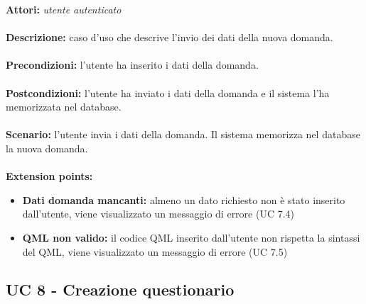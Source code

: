 \documentclass[a4paper,11pt]{article}
\begin{document}
\textbf{Attori:} \textit{utente autenticato}
\\ \\
\textbf{Descrizione:} caso d'uso che descrive l'invio dei dati della nuova domanda.\\
\\
\textbf{Precondizioni:} l'utente ha inserito i dati della domanda.\\
\\
\textbf{Postcondizioni:} l’utente ha inviato i dati della domanda e il sistema l'ha memorizzata nel database.\\
\\
\textbf{Scenario:} l’utente invia i dati della domanda. Il sistema memorizza nel database la nuova domanda.\\
\\
\textbf{Extension points:} 
\begin{itemize}
	\item \textbf{Dati domanda mancanti:} almeno un dato richiesto non è stato inserito dall'utente, viene visualizzato un messaggio di errore (UC 7.4)
	\item \textbf{QML non valido:} il codice QML inserito dall'utente non rispetta la sintassi del QML, viene visualizzato un messaggio di errore (UC 7.5)
\end{itemize}


\newpage
\subsection{UC 8 - Creazione questionario}
\end{document}
